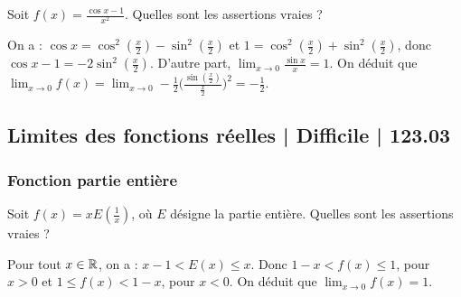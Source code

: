\begin{question}
 
Soit $f(x)= \frac{\cos x-1}{x^2}$. Quelles sont les assertions vraies ?
\begin{answers}

    
    
    
    

 
\end{answers}
\begin{explanations}
On a : $\cos x = \cos^2 (\frac{x}{2}) -  \sin^2 (\frac{x}{2})$ et $1= \cos^2 (\frac{x}{2}) + \sin^2 (\frac{x}{2})$, donc $\cos x - 1 = -2 \sin ^2 (\frac{x}{2})$. D'autre part, $\lim_{x\to 0}\frac{\sin x}{x} = 1$. On déduit que   $\lim_{x\to 0} f(x) = \lim_{x\to 0} -\frac{1}{2}  \big(\frac{\sin (\frac{x}{2})}{\frac{x}{2}}\big)^2 = -\frac{1}{2}$.
\end{explanations}

\end{question}



\subsection{Limites des fonctions réelles | Difficile | 123.03}

\subsubsection{Fonction partie entière}

\begin{question}
 
Soit $f(x)= xE(\frac{1}{x})$, où $E$ désigne la partie entière. Quelles sont les assertions vraies ?
\begin{answers}

    
    
    
    

\end{answers}
\begin{explanations}
Pour tout $x\in \mathbb{R}$, on a : $x-1<E(x)\le x$. Donc $1-x < f(x) \le 1$, pour $x>0$ et  
$1 \le f(x) < 1-x$, pour $x<0$. On déduit que $\lim_{x\to 0} f(x) =1$. 
\end{explanations}

\end{question}
 
